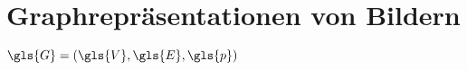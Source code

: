 \chapter{Graphrepräsentationen von Bildern}
\label{graphrepraesentationen_von_bildern}

$\gls{G} = \left(\gls{V}, \gls{E}, \gls{p}\right)$



